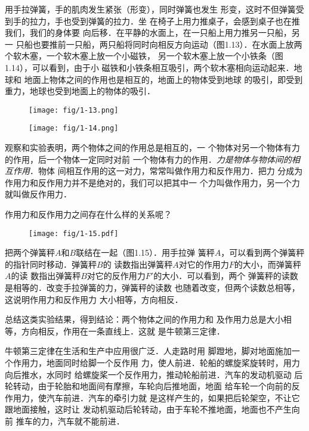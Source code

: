     用手拉弹簧，手的肌肉发生紧张（形变），同时弹簧也发生
形变，这时不但弹簧受到手的拉力，手也受到弹簧的拉力．坐
在椅子上用力推桌子，会感到桌子也在推我们，我们的身体要
向后移．在平静的水面上，在一只船上用力推另一只船，另一
只船也要推前一只船，两只船将同时向相反方向运动（图1.13）．在水面上放两个软木塞，一个软木塞上放一个小磁铁，
另一个软木塞上放一个小铁条（图1.14），可以看到，由于小
磁铁和小铁条相互吸引，两个软木塞相向运动起来．地球和
地面上物体之间的作用也是相互的，地面上的物体受到地球
的吸引，即受到重力，地球也受到地面上的物体的吸引．

\begin{figure}[htp]\centering
\texttt{[image: fig/1-13.png]}
\caption{}
\end{figure}

\begin{figure}[htp]\centering
\texttt{[image: fig/1-14.png]}
\caption{}
\end{figure}

观察和实验表明，两个物体之间的作用总是相互的，一
个物体对另一个物体有力的作用，后一个物体一定同时对前
一个物体有力的作用．\textit{力是物体与物体间的相互作用}．物体
间相互作用的这一对力，常常叫做\textsf{作用力}和\textsf{反作用力}．把力
分成为作用力和反作用力并不是绝对的，我们可以把其中一
个力叫做作用力，另一个力就叫做反作用力．

    作用力和反作用力之间存在什么样的关系呢？

\begin{figure}[htp]\centering
\texttt{[image: fig/1-15.pdf]}
\caption{}
\end{figure}

    把两个弹簧秤$A$和$B$联结在一起（图1.15）．用手拉弹
簧秤$A$，可以看到两个弹簧秤的指针同时移动．弹簧秤$B$的
读数指出弹簧秤$A$对它的作用力$F$的大小，而弹簧秤$A$的读
数指出弹簧秤$B$对它的反作用力$F'$的大小．可以看到，两个
弹簧秤的读数是相等的．改变手拉弹簧的力，弹簧秤的读数
也随着改变，但两个读数总相等，这说明作用力和反作用力
大小相等，方向相反．

    总结这类实验结果，得到结论：\textsf{两个物体之间的作用力和
及作用力总是大小相等，方向相反，作用在一条直线上．}这就
是\textsf{牛顿第三定律}．

牛顿第三定律在生活和生产中应用很广泛．人走路时用
脚蹬地，脚对地面施加一个作用力，地面同时给脚一个反作用
力，使人前进．轮船的螺旋桨旋转时，用力向后推水，水同时
给螺旋桨一个反作用力，推动轮船前进．汽车的发动机驱动
后轮转动，由于轮胎和地面间有摩擦，车轮向后推地面，地面
给车轮一个向前的反作用力，使汽车前进．汽车的牵引力就
是这样产生的，如果把后轮架空，不让它跟地面接触，这时让
发动机驱动后轮转动，由于车轮不推地面，地面也不产生向前
推车的力，汽车就不能前进．

